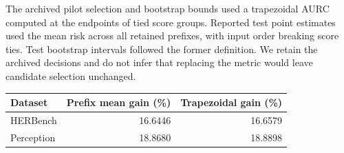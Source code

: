 The archived pilot selection and bootstrap bounds used a trapezoidal AURC
computed at the endpoints of tied score groups. Reported test point estimates
used the mean risk across all retained prefixes, with input order breaking score
ties. Test bootstrap intervals followed the former definition. We retain the
archived decisions and do not infer that replacing the metric would leave
candidate selection unchanged.

\begin{tabular}{lrr}
\hline
Dataset & Prefix mean gain (\%) & Trapezoidal gain (\%) \\
\hline
HERBench & 16.6446 & 16.6579 \\
Perception & 18.8680 & 18.8898 \\
\hline
\end{tabular}

